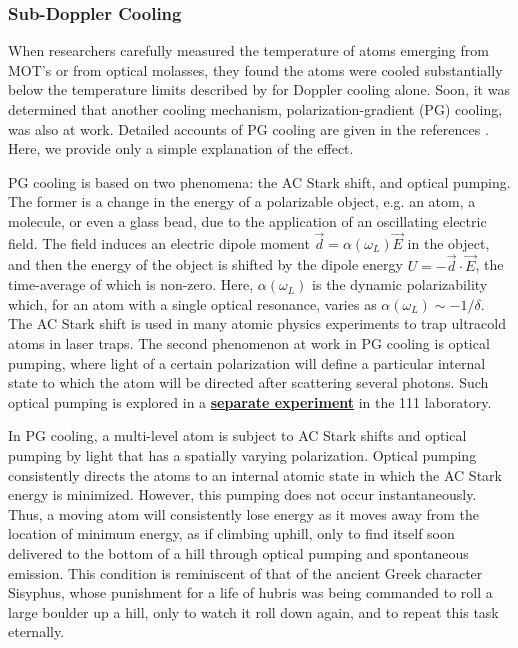 \documentclass{../lab}
\begin{document}
\subsubsection{Sub-Doppler Cooling}

When researchers carefully measured the temperature of atoms emerging from MOT’s or from optical molasses, they found the atoms were cooled substantially below the temperature limits described by  for Doppler cooling alone. Soon, it was determined that another cooling mechanism, polarization-gradient (PG) cooling, was also at work. Detailed accounts of PG cooling are given in the references \cite{Metcalf}. Here, we provide only a simple explanation of the effect.

PG cooling is based on two phenomena: the AC Stark shift, and optical pumping. The former is a change in the energy of a polarizable object, e.g. an atom, a molecule, or even a glass bead, due to the application of an oscillating electric field. The field induces an electric dipole moment $\vec{d} = \alpha(\omega_L)\vec{E}$ in the object, and then the energy of the object is shifted by the dipole energy $ U = -\vec{d}\cdot \vec{E}$, the time-average of which is non-zero. Here, $\alpha(\omega_L)$ is the dynamic polarizability which, for an atom with a single optical resonance, varies as $\alpha(\omega_L) \sim -1/\delta$. The AC Stark shift is used in many atomic physics experiments to trap ultracold atoms in laser traps. The second phenomenon at work in PG cooling is optical pumping, where light of a certain polarization will define a particular internal state to which the atom will be directed after scattering several photons. Such optical pumping is explored in a \href{http://experimentationlab.berkeley.edu/OPT}{\textbf{separate experiment}} in the 111 laboratory.

In PG cooling, a multi-level atom is subject to AC Stark shifts and optical pumping by light that has a spatially varying polarization. Optical pumping consistently directs the atoms to an internal atomic state in which the AC Stark energy is minimized. However, this pumping does not occur instantaneously. Thus, a moving atom will consistently lose energy as it moves away from the location of minimum energy, as if climbing uphill, only to find itself soon delivered to the bottom of a hill through optical pumping and spontaneous emission. This condition is reminiscent of that of the ancient Greek character Sisyphus, whose punishment for a life of hubris was being commanded to roll a large boulder up a hill, only to watch it roll down again, and to repeat this task eternally.
\end{document}
